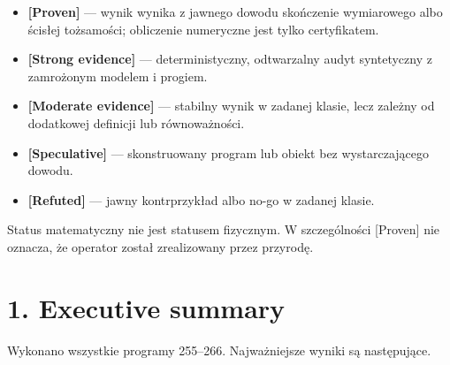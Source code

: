 \documentclass[11pt,a4paper,openany]{report}
\newcommand{\statusProven}{\textcolor{fingreen}{[Proven]}}
\newcommand{\statusStrong}{\textcolor{finblue}{[Strong evidence]}}
\newcommand{\statusModerate}{\textcolor{finviolet}{[Moderate evidence]}}
\newcommand{\statusSpeculative}{\textcolor{finorange}{[Speculative]}}
\newcommand{\statusRefuted}{\textcolor{finred}{[Refuted]}}
\begin{document}
\begin{itemize}
\item 
\textbf{\statusProven{}} --- wynik wynika z jawnego dowodu skończenie wymiarowego albo ścisłej to\.zsamości; obliczenie numeryczne jest tylko certyfikatem.

\item 
\textbf{\statusStrong{}} --- deterministyczny, odtwarzalny audyt syntetyczny z zamro\.zonym modelem i progiem.

\item 
\textbf{\statusModerate{}} --- stabilny wynik w zadanej klasie, lecz zale\.zny od dodatkowej definicji lub równowa\.zności.

\item 
\textbf{\statusSpeculative{}} --- skonstruowany program lub obiekt bez wystarczającego dowodu.

\item 
\textbf{\statusRefuted{}} --- jawny kontrprzykład albo no-go w zadanej klasie.

\end{itemize}

Status matematyczny nie jest statusem fizycznym. W szczególności \statusProven{} nie oznacza, \.ze operator został zrealizowany przez przyrodę.

\chapter{1. Executive summary}

Wykonano wszystkie programy 255--266. Najwa\.zniejsze wyniki są następujące.
\end{document}
